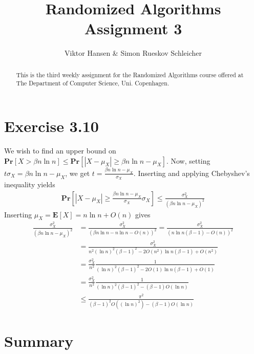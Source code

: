 \documentclass[12pt]{article}
\begin{document}
\nocite{*}


\title{Randomized Algorithms \\
       Assignment 3}

\author{Viktor Hansen \& Simon Rueskov Schleicher}

\maketitle

\begin{abstract}
  This is the third weekly assignment for the Randomized Algorithms course offered at The Department of Computer Science, Uni. Copenhagen.
\end{abstract}

\pagebreak

\section*{Exercise 3.10}
We wish to find an upper bound on $\mathbf{Pr} \left[ X > \beta n \ln n \right] \leq \mathbf{Pr} \left[ \left| X - \mu_X \right| \geq \beta n \ln n - \mu_X \right]$. Now, setting $t\sigma_X = \beta n \ln n - \mu_X$, we get $t = \frac{\beta n \ln n - \mu_X}{\sigma_X}$. Inserting and applying Chebyshev's inequality yields
\begin{align*}
\mathbf{Pr} \left[ \left| X - \mu_X \right| \geq \frac{\beta n \ln n - \mu_X}{\sigma_X} \sigma_X \right] \leq \frac{\sigma_X^2}{(\beta n \ln n - \mu_X)^2}
\end{align*}
Inserting $\mu_X = \mathbf{E} \left[ X \right] = n \ln n + O(n)$ gives
\begin{align*}
\frac{\sigma_X^2}{(\beta n \ln n - \mu_X)^2} &= \frac{\sigma_X^2}{(\beta n \ln n - n \ln n - O(n))^2} = \frac{\sigma_X^2}{(n \ln n(\beta - 1) - O(n))^2} \\
&= \frac{\sigma_X^2}{n^2 (\ln n)^2 (\beta - 1)^2 - 2 O(n^2) \ln n (\beta - 1) + O(n^2)} \\
&= \frac{\sigma_X^2}{n^2} \frac{1}{(\ln n)^2(\beta-1)^2-2O(1) \ln n (\beta-1) + O(1)} \\
&= \frac{\sigma_X^2}{n^2} \frac{1}{(\ln n)^2(\beta-1)^2-(\beta-1)O(\ln n)} \\
&\leq \frac{\pi^2}{(\beta-1)^2 O((\ln n)^2)-(\beta-1)O(\ln n)}
\end{align*}

\pagebreak

\section*{Summary}
\end{document}
